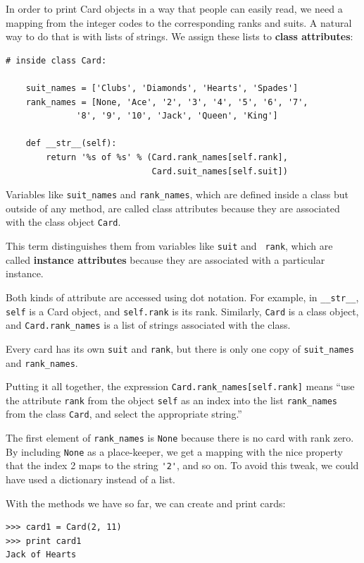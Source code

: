 \documentclass[10pt]{book}
\begin{document}
\begin{CJK}{UTF8}{gbsn}
In order to print Card objects in a way that people can easily
read, we need a mapping from the integer codes to the corresponding
ranks and suits.  A natural way to
do that is with lists of strings.  We assign these lists to {\bf class
attributes}:

\begin{verbatim}
# inside class Card:

    suit_names = ['Clubs', 'Diamonds', 'Hearts', 'Spades']
    rank_names = [None, 'Ace', '2', '3', '4', '5', '6', '7', 
              '8', '9', '10', 'Jack', 'Queen', 'King']

    def __str__(self):
        return '%s of %s' % (Card.rank_names[self.rank],
                             Card.suit_names[self.suit])
\end{verbatim}
%
Variables like \verb"suit_names" and \verb"rank_names", which are
defined inside a class but outside of any method, are called
class attributes because they are associated with the class object 
{\tt Card}.

This term distinguishes them from variables like {\tt suit} and {\tt
  rank}, which are called {\bf instance attributes} because they are
associated with a particular instance.

Both kinds of attribute are accessed using dot notation.  For
example, in \verb"__str__", {\tt self} is a Card object,
and {\tt self.rank} is its rank.  Similarly, {\tt Card}
is a class object, and \verb"Card.rank_names" is a
list of strings associated with the class.

Every card has its own {\tt suit} and {\tt rank}, but there
is only one copy of \verb"suit_names" and \verb"rank_names".

Putting it all together, the expression
\verb"Card.rank_names[self.rank]" means ``use the attribute {\tt rank}
from the object {\tt self} as an index into the list \verb"rank_names"
from the class {\tt Card}, and select the appropriate string.''

The first element of \verb"rank_names" is {\tt None} because there
is no card with rank zero.  By including {\tt None} as a place-keeper,
we get a mapping with the nice property that the index 2 maps to the
string \verb"'2'", and so on.  To avoid this tweak, we could have
used a dictionary instead of a list.

With the methods we have so far, we can create and print cards:

\begin{verbatim}
>>> card1 = Card(2, 11)
>>> print card1
Jack of Hearts
\end{verbatim}


\end{CJK}
\end{document}
